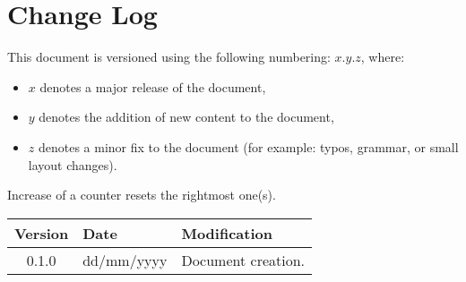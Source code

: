 \chapter*{Change Log}
This document is versioned using the following numbering: $x.y.z$, where:
\begin{itemize}
	\item $x$ denotes a major release of the document,
	\item $y$ denotes the addition of new content to the document,
	\item $z$ denotes a minor fix to the document (for example: typos, grammar, or small layout changes).
\end{itemize}
Increase of a counter resets the rightmost one(s).
\\[\baselineskip]
\noindent
\begin{tabularx}{\textwidth}{clX}
	\toprule
	\textbf{Version} & \textbf{Date} & \textbf{Modification}\\
	\toprule
	0.1.0 & dd/mm/yyyy & Document creation.\\
	\midrule

	\bottomrule
\end{tabularx}
